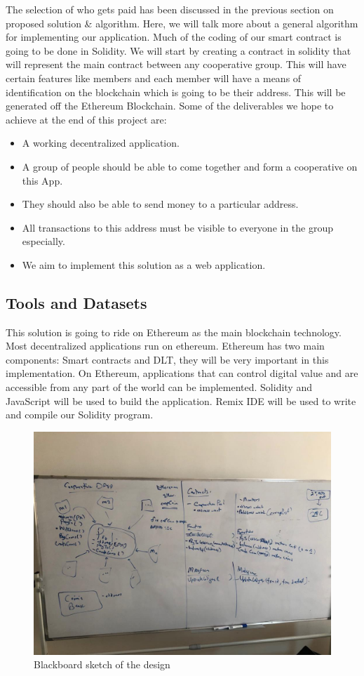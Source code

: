 \documentclass{article}
\begin{document}
The selection of who gets paid has been discussed in the previous section on proposed solution & algorithm. Here, we will talk more about a general algorithm for implementing our application. Much of the coding of our smart contract is going to be done in Solidity. We will start by creating a contract in solidity that will represent the main contract between any cooperative group. This will have certain features like members and each member will have a means of identification on the blockchain which is going to be their address. This will be generated off the Ethereum Blockchain.
Some of the deliverables we hope to achieve at the end of this project are:
\begin{itemize}
    \item A working decentralized application.
    \item A group of people should be able to come together and form a cooperative on this App.
    \item They should also be able to send money to a particular address.
    \item All transactions to this address must be visible to everyone in the group especially.
    \item We aim to implement this solution as a web application.
\end{itemize}

\subsection{Tools and Datasets}
This solution is going to ride on Ethereum as the main blockchain technology. Most decentralized applications run on ethereum. Ethereum has two main components: Smart contracts and DLT, they will be very important in this implementation. On Ethereum, applications that can control digital value and are accessible from any part of the world can be implemented. Solidity and JavaScript will be used to build the application. Remix IDE will be used to write and compile our Solidity program.

\begin{figure}[H]
\centering
\includegraphics[scale=0.4]{design}
\caption{Blackboard sketch of the design}
\label{fig:dessign}
\end{figure}
\end{document}
